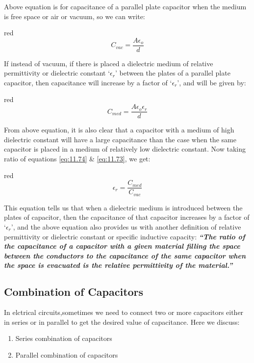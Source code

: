 Above equation is for capacitance of a parallel plate capacitor
when the medium is free space or air or vacuum, so we can write:
\begin{mybox}{red}{}
\begin{equation}\label{eq:11.73}
  C_{vac} =  \frac{A\epsilon_{o}}{d}
\end{equation}
\end{mybox}
If instead of vacuum, if there is placed a dielectric medium of relative
permittivity or dielectric constant `$\epsilon_{r}$’ between the plates
of a parallel plate capacitor,
then capacitance will increase by a factor of `$\epsilon_{r}$’, and will be given by:
\begin{mybox}{red}{}
\begin{equation}\label{eq:11.74}
  C_{med}=  \frac{A\epsilon_{o}\epsilon_{r}}{d}
\end{equation}
\end{mybox}
From above equation,  it is also clear that a capacitor with a medium of high dielectric constant will have a large capacitance than the case when the same capacitor is placed in a medium of relatively low dielectric constant.
Now taking ratio of equations \ref{eq:11.74} \& \ref{eq:11.73}, we get:
\begin{mybox}{red}{}
\begin{equation}
  \epsilon_{r} = \frac{C_{med}}{C_{vac}}
\end{equation}
\end{mybox}
This equation tells us that when a dielectric medium is introduced between
the plates of capacitor, then the capacitance of that capacitor increases
by a factor of `$\epsilon_{r}$’, and the above equation also provides us
with another definition of relative permittivity or dielectric constant or
specific inductive capacity:
\textit{\textbf{“The ratio of the capacitance of a capacitor with a given material filling
the space between the conductors to the capacitance of the same capacitor
when the space is evacuated is the relative permittivity of the material.”}}
\subsection{Combination of Capacitors}
In elctrical circuits,sometimes we need to connect two or more
capacitors either in series or in parallel to get the desired value of
capacitance. Here we discuss:
\begin{enumerate}[label = (\roman*)]
\item Series combination of capacitors
\item Parallel combination of capacitors
\end{enumerate}
